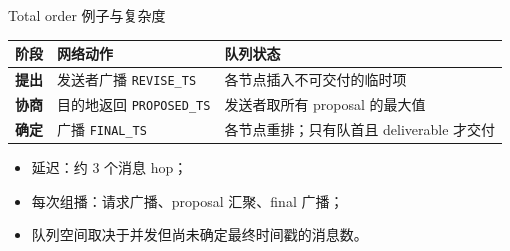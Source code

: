 \documentclass[UTF8,fontset=none,aspectratio=169,10pt]{beamer}
\begin{document}
{\begin{frame}{Total order 例子与复杂度}
\begin{tabularx}{\linewidth}{>{\bfseries}p{2.2cm}XX}
\toprule
阶段 & 网络动作 & 队列状态 \\
\midrule
提出 & 发送者广播 \texttt{REVISE\_TS} & 各节点插入不可交付的临时项 \\
协商 & 目的地返回 \texttt{PROPOSED\_TS} & 发送者取所有 proposal 的最大值 \\
确定 & 广播 \texttt{FINAL\_TS} & 各节点重排；只有队首且 deliverable 才交付 \\
\bottomrule
\end{tabularx}
\vfill
\begin{itemize}
  \item 延迟：约 3 个消息 hop；
  \item 每次组播：请求广播、proposal 汇聚、final 广播；
  \item 队列空间取决于并发但尚未确定最终时间戳的消息数。
\end{itemize}
\end{frame}


}
\end{document}
